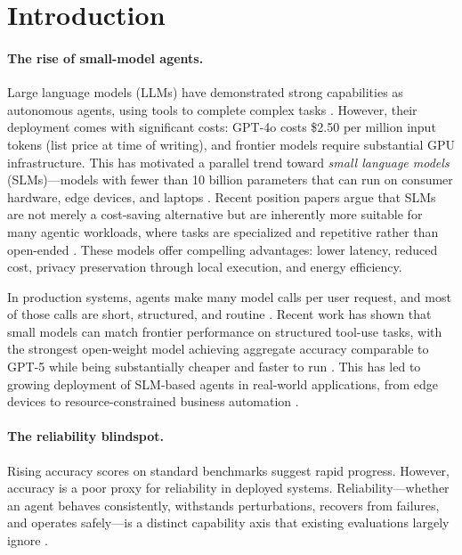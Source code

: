 
\section{Introduction}

\paragraph{The rise of small-model agents.}
Large language models (LLMs) have demonstrated strong capabilities as autonomous agents, using tools to complete complex tasks \cite{yao2023react, schick2023toolformer}. However, their deployment comes with significant costs: GPT-4o costs \$2.50 per million input tokens (list price at time of writing), and frontier models require substantial GPU infrastructure. This has motivated a parallel trend toward \emph{small language models} (SLMs)---models with fewer than 10 billion parameters that can run on consumer hardware, edge devices, and laptops \cite{belcak2025small, erdogan2024tinyagent, zhang2024tinyllama}. Recent position papers argue that SLMs are not merely a cost-saving alternative but are inherently more suitable for many agentic workloads, where tasks are specialized and repetitive rather than open-ended \cite{belcak2025small}. These models offer compelling advantages: lower latency, reduced cost, privacy preservation through local execution, and energy efficiency.

In production systems, agents make many model calls per user request, and most of those calls are short, structured, and routine \cite{karmakar2026agentfloor}. Recent work has shown that small models can match frontier performance on structured tool-use tasks, with the strongest open-weight model achieving aggregate accuracy comparable to GPT-5 while being substantially cheaper and faster to run \cite{karmakar2026agentfloor}. This has led to growing deployment of SLM-based agents in real-world applications, from edge devices \cite{erdogan2024tinyagent} to resource-constrained business automation \cite{wang2026agentic, cho2026harness}.

\paragraph{The reliability blindspot.}
Rising accuracy scores on standard benchmarks suggest rapid progress. However, accuracy is a poor proxy for reliability in deployed systems. Reliability---whether an agent behaves consistently, withstands perturbations, recovers from failures, and operates safely---is a distinct capability axis that existing evaluations largely ignore \cite{rabanser2026science, gupta2026reliabilitybench, yagubyan2026consistency}.


